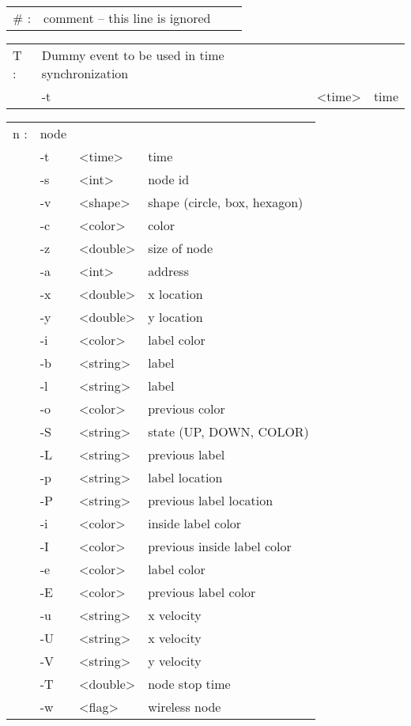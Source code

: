  \begin{tabular}{llll}
  \# : & comment -- this line is ignored & & \\
  \end{tabular}

  \begin{tabular}{llll}
  T : & Dummy event to be used in time synchronization & & \\
    &  -t & <time> & time \\
  \end{tabular}

  \begin{tabular}{llll}
  n : & node & & \\
    &  -t & <time> & time \\
    &  -s & <int> & node id \\
    &  -v & <shape> & shape (circle, box, hexagon) \\
    &  -c & <color> & color \\
    &  -z & <double> & size of node \\
    &  -a & <int> & address \\
    &  -x & <double> & x location \\
    &  -y & <double> & y location \\
    &  -i & <color> & label color \\
    &  -b & <string> & label \\
    &  -l & <string> & label \\
    &  -o & <color> & previous color \\
    &  -S & <string> & state (UP, DOWN, COLOR) \\
    &  -L & <string> & previous label \\
    &  -p & <string> & label location \\
    &  -P & <string> & previous label location \\
    &  -i & <color> & inside label color \\
    &  -I & <color> & previous inside label color \\
    &  -e & <color> & label color \\
    &  -E & <color> & previous label color \\
    &  -u & <string> & x velocity \\
    &  -U & <string> & x velocity \\
    &  -V & <string> & y velocity \\
    &  -T & <double> & node stop time \\
    &  -w & <flag> & wireless node \\
  \end{tabular}

